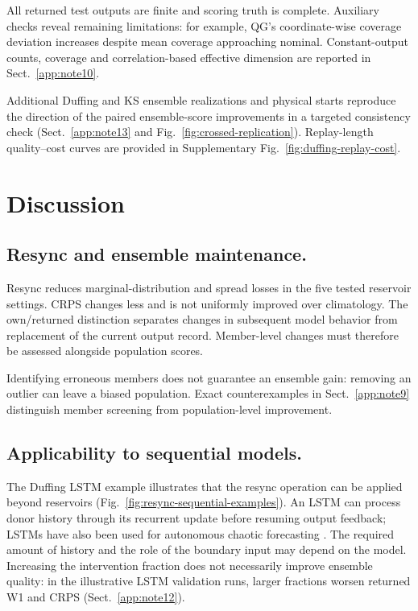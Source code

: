 \documentclass[gmd,manuscript]{copernicus}
\begin{document}
All returned test outputs are finite and scoring truth is complete. Auxiliary checks reveal remaining limitations: for example, QG's coordinate-wise coverage deviation increases despite mean coverage approaching nominal. Constant-output counts, coverage and correlation-based effective dimension are reported in Sect.~\ref{app:note10}.

Additional Duffing and KS ensemble realizations and physical starts reproduce the direction of the paired ensemble-score improvements in a targeted consistency check (Sect.~\ref{app:note13} and Fig.~\ref{fig:crossed-replication}). Replay-length quality--cost curves are provided in Supplementary Fig.~\ref{fig:duffing-replay-cost}.

\section{Discussion}

\subsection{Resync and ensemble maintenance.}
Resync reduces marginal-distribution and spread losses in the five tested reservoir settings. CRPS changes less and is not uniformly improved over climatology. The own/returned distinction separates changes in subsequent model behavior from replacement of the current output record. Member-level changes must therefore be assessed alongside population scores.

Identifying erroneous members does not guarantee an ensemble gain: removing an outlier can leave a biased population. Exact counterexamples in Sect.~\ref{app:note9} distinguish member screening from population-level improvement.

\subsection{Applicability to sequential models.}
The Duffing LSTM example illustrates that the resync operation can be applied beyond reservoirs (Fig.~\ref{fig:resync-sequential-examples}). An LSTM can process donor history through its recurrent update before resuming output feedback; LSTMs have also been used for autonomous chaotic forecasting \citep{vlachas2018lstm}. The required amount of history and the role of the boundary input may depend on the model. Increasing the intervention fraction does not necessarily improve ensemble quality: in the illustrative LSTM validation runs, larger fractions worsen returned W1 and CRPS (Sect.~\ref{app:note12}).
\end{document}
